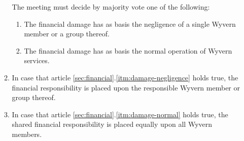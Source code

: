 \begin{enumerate}
\begin{item}
\begin{enumerate}
            \begin{item}
                The meeting must decide by majority vote one of the following:

                \begin{enumerate}
                    \item \label{itm:damage-negligence} The financial damage has as basis the negligence of a single Wyvern member or a group thereof.
                    \item \label{itm:damage-normal} The financial damage has as basis the normal operation of Wyvern services.
                \end{enumerate}
            \end{item}

            \item In case that article \ref{sec:financial}.\ref{itm:damage-negligence} holds true, the financial responsibility is placed upon the responsible Wyvern member or group thereof.

            \item In case that article \ref{sec:financial}.\ref{itm:damage-normal} holds true, the shared financial responsibility is placed equally upon all Wyvern members.
        \end{enumerate}

    \end{item}
\end{enumerate}
\newpage
